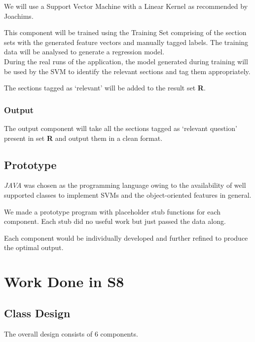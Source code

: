 \documentclass[10pt,a4paper]{report}
\begin{document}
We will use a Support Vector Machine with a Linear Kernel as recommended by Joachims\cite{joachims}.

This component will be trained using the Training Set comprising of the section sets with the generated feature vectors and manually tagged labels. The training data will be analysed to generate a regression model. \\

During the real runs of the application, the model generated during training will be used by the SVM to identify the relevant sections and tag them appropriately. 

The sections tagged as `relevant' will be added to the result set \textbf{R}.\\

\subsection{Output}

The output component will take all the sections tagged as `relevant question' present in set \textbf{R} and output them in a clean format.

\section{Prototype}

\textit{JAVA} was chosen as the programming language owing to the availability of well supported classes to implement SVMs and the object-oriented features in general.

We made a prototype program with placeholder stub functions for each component. Each stub did no useful work but just passed the data along.

Each component would be individually developed and further refined to produce the optimal output.


\chapter{Work Done in S8}

\section{Class Design}

The overall design consists of 6 components. \\
\end{document}
